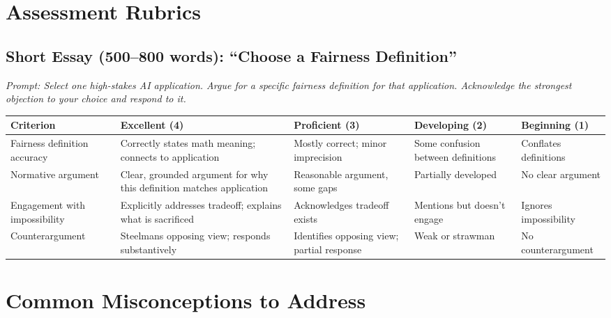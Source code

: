 \section*{Assessment Rubrics}

\subsection*{Short Essay (500--800 words): ``Choose a Fairness Definition''}

\textit{Prompt: Select one high-stakes AI application. Argue for a specific fairness definition for that application. Acknowledge the strongest objection to your choice and respond to it.}

\begin{center}
\begin{tabular}{p{3cm}p{2.8cm}p{2.8cm}p{2.8cm}p{2cm}}
\toprule
\textbf{Criterion} & \textbf{Excellent (4)} & \textbf{Proficient (3)} & \textbf{Developing (2)} & \textbf{Beginning (1)} \\
\midrule
Fairness definition accuracy & Correctly states math meaning; connects to application & Mostly correct; minor imprecision & Some confusion between definitions & Conflates definitions \\
\addlinespace
Normative argument & Clear, grounded argument for why this definition matches application & Reasonable argument, some gaps & Partially developed & No clear argument \\
\addlinespace
Engagement with impossibility & Explicitly addresses tradeoff; explains what is sacrificed & Acknowledges tradeoff exists & Mentions but doesn't engage & Ignores impossibility \\
\addlinespace
Counterargument & Steelmans opposing view; responds substantively & Identifies opposing view; partial response & Weak or strawman & No counterargument \\
\bottomrule
\end{tabular}
\end{center}

\section*{Common Misconceptions to Address}

